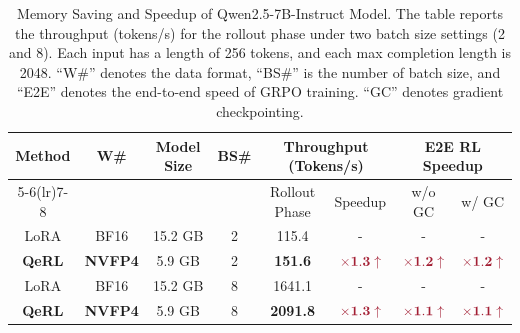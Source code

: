 \begin{table}[!t]
\centering
\begin{tabular}{cccccccc}
\toprule
\multirow{2}{*}{\textbf{Method}} & \multirow{2}{*}{\textbf{W\#}} & \multirow{2}{*}{\textbf{Model Size}} & \multirow{2}{*}{\textbf{BS\#}} & \multicolumn{2}{c}{\textbf{Throughput (Tokens/s)}} & \multicolumn{2}{c}{\textbf{E2E RL Speedup}} \\ 
\cmidrule(lr){5-6}\cmidrule(lr){7-8}
&&&& Rollout Phase & Speedup & w/o GC & w/ GC \\
\midrule
LoRA&BF16  & 15.2 GB& 2 & 115.4 & - & - & - \\  
\textbf{QeRL}&\textbf{NVFP4}  & 5.9 GB& 2  & \textbf{151.6}&$\textcolor{hanred}{\times\mathbf{1.3}\uparrow}$&$\textcolor{hanred}{\times\mathbf{1.2}\uparrow}$&$\textcolor{hanred}{\times\mathbf{1.2}\uparrow}$  \\ 
\midrule \midrule
LoRA&BF16  &15.2 GB& 8 &1641.1& - & - & - \\ 
\textbf{QeRL}&\textbf{NVFP4}  & 5.9 GB& 8 & \textbf{2091.8}&$\textcolor{hanred}{\times\mathbf{1.3}\uparrow}$&$\textcolor{hanred}{\times\mathbf{1.1}\uparrow}$&$\textcolor{hanred}{\times\mathbf{1.1}\uparrow}$ \\ 
\bottomrule
\end{tabular}
\caption{Memory Saving and Speedup of Qwen2.5-7B-Instruct Model. The table reports the throughput (tokens/s) for the rollout phase under two batch size settings (2 and 8). Each input has a length of 256 tokens, and each max completion length is 2048. ``W\#'' denotes the data format, ``BS\#'' is the number of batch size, and ``E2E'' denotes the end-to-end speed of GRPO training. ``GC'' denotes gradient checkpointing.} \label{tab:efficiency_7b}
\end{table}





